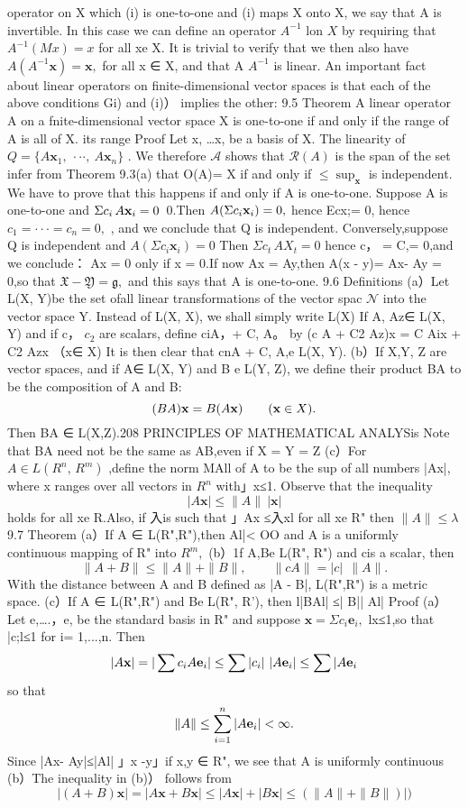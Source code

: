 operator on X which (i) is one-to-one and (i) maps X onto X, we say that A is invertible. In this case we can define an operator $A^{-1}$ lon $X$ by requiring that $A^{-1}(M x)=x$ for all xe X. It is trivial to verify that we then also have $A(A^{-1}\mathbf{x})=\mathbf{x},$ for all x ∈ X, and that A $A^{-1}$ is linear. An important fact about linear operators on finite-dimensional vector spaces is that each of the above conditions Gi) and (i)） implies the other: 9.5 Theorem A linear operator A on a fnite-dimensional vector space X is one-to-one if and only if the range of A is all of X. its range Proof Let {x, …x,} be a basis of X. The linearity of $Q=\{A\mathbf{x}_{1},\ \cdot\cdot\cdot,\ A\mathbf{x}_{n}\}$ . We therefore ${\mathcal{A}}$ shows that ${\mathcal{R}}(A)$ is the span of the set infer from Theorem 9.3(a) that O(A)= X if and only if $\leq\sup_{\mathbf{x}}$ is independent. We have to prove that this happens if and only if A is one-to-one. Suppose A is one-to-one and $\Sigma c_{i}\,A{\bf x}_{i}=0\,$ 0.Then $A(\Sigma c_{i}{\bf x}_{i})=0,$ hence Ecx;= 0, hence $c_{1}=\cdot\cdot\cdot=c_{n}=0,$ , and we conclude that Q is independent. Conversely,suppose Q is independent and $A(\Sigma c_{i}\mathbf{x}_{i})=0$ Then $\Sigma c_{t}\,A X_{t}=0$ hence c， = C,= 0,and we conclude： Ax = 0 only if x = 0.If now Ax = Ay,then A(x - y)= Ax- Ay = 0,so that ${\mathfrak{X}}-{\mathfrak{Y}}={\mathfrak{g}},$ and this says that A is one-to-one. 9.6 Definitions (a）Let L(X, Y)be the set ofall linear transformations of the vector spac $\mathcal{N}$ into the vector space Y. Instead of L(X, X), we shall simply write L(X) If A, Az∈ L(X, Y) and if c， $c_{\mathrm{2}}$ are scalars, define ciA，+ C, A。 by (c A + C2 Az)x = C Aix + C2 Azx （x∈ X) It is then clear that cnA + C, A,e L(X, Y). (b）If X,Y, Z are vector spaces, and if A∈ L(X, Y) and B e L(Y, Z), we define their product BA to be the composition of A and B: $$ (B A){\bf x}=B(A{\bf x})\qquad({\bf x}\in X). $$ Then BA ∈ L(X,Z).208 PRINCIPLES OF MATHEMATICAL ANALYSis Note that BA need not be the same as AB,even if X = Y = Z (c）For $A\in L(R^{n},\,R^{m})$ ,define the norm MAll of A to be the sup of all numbers |Ax|, where x ranges over all vectors in $\textstyle R^{n}$ with」x≤1. Observe that the inequality $$ |A{\mathbf{x}}|\leq\|A\|\ |\mathbf{x}| $$ holds for all xe R.Also, if 入is such that 」Ax ≤入xl for all xe R" then $\|A\|\leq\lambda$ 9.7 Theorem (a）If A ∈ L(R",R"),then Al|< OO and A is a uniformly continuous mapping of R" into $R^{m},$ (b）1f A,Be L(R", R") and cis a scalar, then $$ \|A+B\|\leq\|A\|+\|B\|,\qquad\|c A\|=|c|\ \ \|A\|. $$ With the distance between A and B defined as |A - B|, L(R",R") is a metric space. (c）If A ∈ L(R",R") and Be L(R", R'), then l|BAl| ≤| B|| Al| Proof (a） Let {e,….，e,} be the standard basis in R" and suppose $\mathbf{x}=\Sigma c_{i}\mathbf{e}_{i},$ lx≤1,so that |c;l≤1 for i= 1,...,n. Then $$ |A{\bf x}|=|\sum c_{i}A{\bf e}_{i}|\leq\sum|c_{i}|~|A{\bf e}_{i}|\leq\sum|A{\bf e}_{i} $$ so that $$ \|A\|\le\sum_{i=1}^{n}\vert A{\bf e}_{i}\vert<\infty. $$ Since |Ax- Ay|≤|Al| 」x -y」if x,y ∈ R", we see that A is uniformly continuous (b）The inequality in (b)） follows from $$ |(A+B)\mathbf{x}|=|A\mathbf{x}+B\mathbf{x}|\leq|A\mathbf{x}|+|B\mathbf{x}|\leq(\|A\|+\|B\|)|) $$ 